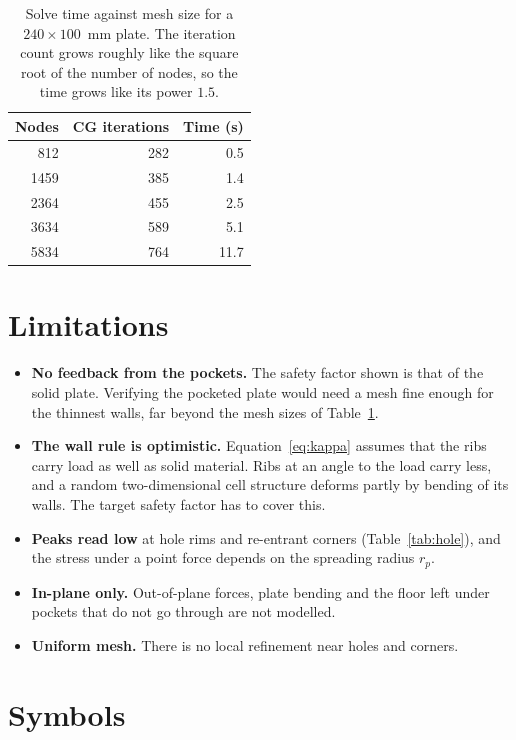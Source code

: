 \documentclass[11pt,a4paper]{article}
\begin{document}
\begin{table}[ht]
  \centering
  \begin{tabular}{rrr}
    \toprule
    Nodes & CG iterations & Time (s)\\
    \midrule
    812 & 282 & 0.5\\
    1459 & 385 & 1.4\\
    2364 & 455 & 2.5\\
    3634 & 589 & 5.1\\
    5834 & 764 & 11.7\\
    \bottomrule
  \end{tabular}
  \caption{Solve time against mesh size for a $240\times100$~mm plate. The
           iteration count grows roughly like the square root of the number
           of nodes, so the time grows like its power $1.5$.}
  \label{tab:time}
\end{table}

\section{Limitations}

\begin{itemize}
  \item \textbf{No feedback from the pockets.} The safety factor shown is
        that of the solid plate. Verifying the pocketed plate would need a
        mesh fine enough for the thinnest walls, far beyond the mesh sizes
        of Table~\ref{tab:time}.
  \item \textbf{The wall rule is optimistic.} Equation~\eqref{eq:kappa}
        assumes that the ribs carry load as well as solid material. Ribs at
        an angle to the load carry less, and a random two-dimensional cell
        structure deforms partly by bending of its walls. The target safety
        factor has to cover this.
  \item \textbf{Peaks read low} at hole rims and re-entrant corners
        (Table~\ref{tab:hole}), and the stress under a point force depends on
        the spreading radius $r_p$.
  \item \textbf{In-plane only.} Out-of-plane forces, plate bending and the
        floor left under pockets that do not go through are not modelled.
  \item \textbf{Uniform mesh.} There is no local refinement near holes and
        corners.
\end{itemize}

\section*{Symbols}
\end{document}
